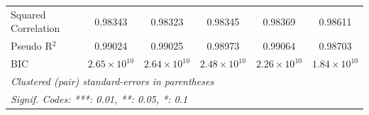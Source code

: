 \begin{table}[htbp]
\begin{tabular}{lccccc}
      Squared Correlation & 0.98343               & 0.98323               & 0.98345               & 0.98369               & 0.98611\\  
      Pseudo R$^2$        & 0.99024               & 0.99025               & 0.98973               & 0.99064               & 0.98703\\  
      BIC                 & $2.65\times 10^{10}$  & $2.64\times 10^{10}$  & $2.48\times 10^{10}$  & $2.26\times 10^{10}$  & $1.84\times 10^{10}$\\   
      \midrule \midrule
      \multicolumn{6}{l}{\emph{Clustered (pair) standard-errors in parentheses}}\\
      \multicolumn{6}{l}{\emph{Signif. Codes: ***: 0.01, **: 0.05, *: 0.1}}\\
   \end{tabular}
\end{table}


